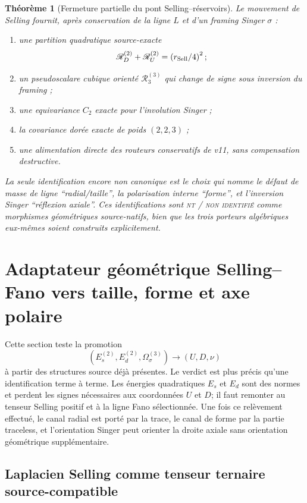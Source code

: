 \documentclass[11pt,a4paper]{article}
\newtheorem{theorem}{Théorème}[section]
\newcommand{\statusNT}{\textsc{nt / non identifié}}
\begin{document}
\begin{theorem}[Fermeture partielle du pont Selling--réservoirs]\label{thm:v12-promotion}
Le mouvement de Selling fournit, après conservation de la ligne $L$ et d'un framing Singer $\sigma$ :
\begin{enumerate}[label=\textup{(\roman*)}]
\item une partition quadratique source-exacte
\[
 \mathscr R_D^{(2)}+\mathscr R_U^{(2)}
 =\left(r_{\rm Sell}/4\right)^2;
\]
\item un pseudoscalare cubique orienté $\mathscr R_3^{(3)}$ qui change de signe sous inversion du framing ;
\item une equivariance $C_2$ exacte pour l'involution Singer ;
\item la covariance dorée exacte de poids $(2,2,3)$ ;
\item une alimentation directe des routeurs conservatifs de v11, sans compensation destructive.
\end{enumerate}
La seule identification encore non canonique est le choix qui nomme le défaut de masse de ligne ``radial/taille'', la polarisation interne ``forme'', et l'inversion Singer ``réflexion axiale''. Ces identifications sont \statusNT{} comme morphismes géométriques source-natifs, bien que les trois porteurs algébriques eux-mêmes soient construits explicitement.
\end{theorem}


\section{Adaptateur géométrique Selling--Fano vers taille, forme et axe polaire}\label{sec:v13-geometric-adapter}

Cette section teste la promotion
\[
 \left(E_s^{(2)},E_d^{(2)},\Omega_\sigma^{(3)}\right)
 \longrightarrow
 (U,D,\nu)
\]
à partir des structures source déjà présentes. Le verdict est plus précis qu'une identification terme à terme. Les énergies quadratiques $E_s$ et $E_d$ sont des normes et perdent les signes nécessaires aux coordonnées $U$ et $D$; il faut remonter au tenseur Selling positif et à la ligne Fano sélectionnée. Une fois ce relèvement effectué, le canal radial est porté par la trace, le canal de forme par la partie traceless, et l'orientation Singer peut orienter la droite axiale sans orientation géométrique supplémentaire.

\subsection{Laplacien Selling comme tenseur ternaire source-compatible}
\end{document}
